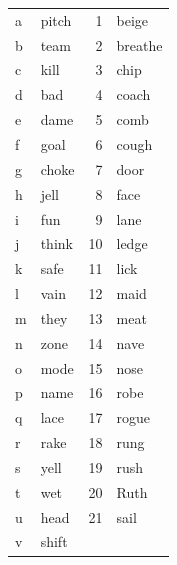 \documentclass[11pt]{article}
\begin{document}
\begin{problem}{2}
\begin{description}
	\begin{tabular}{l p{6cm} | r l}
		a & pitch &   1 & beige \\
		b & team & 2 & breathe \\  
		c & kill & 3 & chip \\  
		d & bad & 4 & coach \\  
		e & dame & 5 & comb \\  
		f & goal & 6 & cough \\  
		g & choke & 7 & door \\  
		h & jell & 8 & face \\  
		i & fun & 9 & lane \\  
		j & think & 10 & ledge \\  
		k & safe & 11 & lick \\  
		l & vain & 12 & maid \\  
		m & they & 13 & meat \\  
		n & zone & 14 & nave \\  
		o & mode & 15 & nose \\  
		p & name & 16 & robe \\  
		q & lace & 17 & rogue \\  
		r & rake & 18 & rung \\  
		s & yell & 19 & rush \\  
		t & wet & 20 & Ruth \\  
		u & head & 21 & sail \\  
		v & shift &  & 
	\end{tabular}

\end{description}

\end{problem}

\newpage
\end{document}
